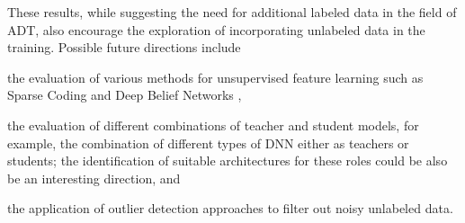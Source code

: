 \documentclass{article}
\begin{document}
These results, while suggesting the need for additional labeled data in the field of ADT, also encourage the exploration of incorporating unlabeled data in the training. 
Possible future directions include
\begin{inparaenum}[(i)]
	\item the evaluation of various methods for unsupervised feature learning such as Sparse Coding \cite{Raina2007a} and Deep Belief Networks \cite{Hamel2010},
    \item the evaluation of different combinations of teacher and student models, for example, the combination of different types of DNN either as teachers or students; the identification of suitable architectures for these roles could be also be an interesting direction, and
    \item the application of outlier detection \cite{Lu2016} approaches to filter out noisy unlabeled data.   
\end{inparaenum} 



%
%
%
%
\end{document}
